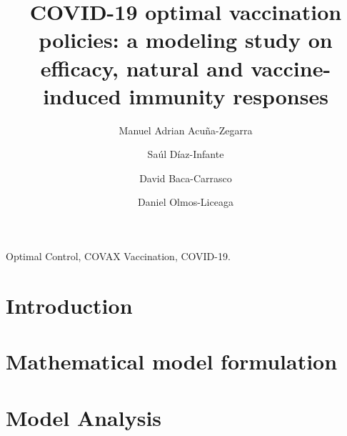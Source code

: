 \documentclass[3p, sort&compress]{elsarticle}
\begin{document}
    \begin{frontmatter}
        \title{
            COVID-19 optimal vaccination policies:
            a modeling study on efficacy, natural and
            vaccine-induced immunity responses
        }
        \author[add:unison]%
        {Manuel Adrian Acu\~na-Zegarra}
        \address[add:unison]{
            Departamento de Matem\'aticas, Universidad de Sonora,
            Blvd. Luis Encinas y Rosales S/N,
            Hermosillo, Sonora, M\'exico, C.P. 83000.
        }
        \author[add:conacyt_unison]{%
        Sa\'ul D\'iaz-Infante%
    }%
    \address[add:conacyt_unison]{
        CONACYT-Universidad de Sonora,
        Departamento de Matem\'aticas,
        Blvd. Luis Encinas y Rosales S/N,
        Hermosillo, Sonora, M\'exico, C.P. 83000.
    }
        \author[add:itson]%
            {David Baca-Carrasco}
        \address[add:itson]{
                Departamento de Matem\'aticas, Instituto Tecnol\'ogico de
                Sonora, 5 de Febrero 818 Sur, Colonia Centro, Ciudad
                Obregón,
                Sonora, M\'exico, C.P. 85000.
        }
        \author[add:unison]%
        {Daniel Olmos-Liceaga}
    \begin{keyword}
        Optimal Control, COVAX
        Vaccination, COVID-19.
    \end{keyword}
    
\end{frontmatter}
%
    \section{Introduction}
        
    \section{Mathematical model formulation}
        \label{Sec:MathematicalModelFormulation}
        
    \section{Model Analysis}
        \label{Sec:Rv_Analysis}
        
\end{document}
